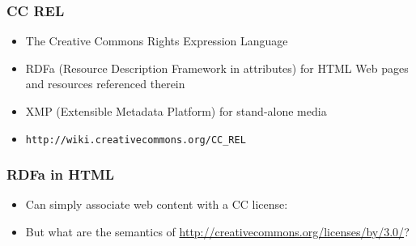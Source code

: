 \documentclass[mathserif,xcolor=dvipsnames,handout]{beamer}
\begin{document}
    \begin{frame}[t]
        \frametitle{CC REL}
        \begin{itemize}
            \item The Creative Commons Rights Expression Language
            \item RDFa (Resource Description Framework in attributes) for HTML
            Web pages and resources referenced therein
            \item XMP (Extensible Metadata Platform) for stand-alone media
            \item \texttt{http://wiki.creativecommons.org/CC\_REL}
        \end{itemize}
    \end{frame}

\begin{frame}[fragile]
\frametitle{RDFa in HTML}
        \begin{itemize}
            \item Can simply associate web content with a CC license:
        \end{itemize}

        \begin{itemize}
            \item But what are the semantics of \url{http://creativecommons.org/licenses/by/3.0/}?
        \end{itemize}
\end{frame}
\end{document}
